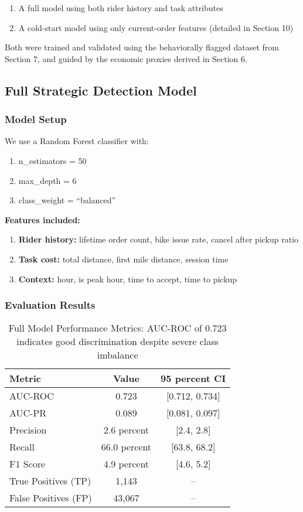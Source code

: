 \documentclass[12pt,letterpaper]{article}
\begin{document}
\begin{enumerate}
    \item A full model using both rider history and task attributes
    \item A cold-start model using only current-order features (detailed in Section 10)
\end{enumerate}

Both were trained and validated using the behaviorally flagged dataset from Section 7, and guided by the economic proxies derived in Section 6.

\subsection{Full Strategic Detection Model}

\subsubsection{Model Setup}

We use a Random Forest classifier with:

\begin{enumerate}
    \item n\_estimators = 50
    \item max\_depth = 6
    \item class\_weight = ``balanced''
\end{enumerate}

\textbf{Features included:}
\begin{enumerate}
    \item \textbf{Rider history:} lifetime order count, bike issue rate, cancel after pickup ratio
    \item \textbf{Task cost:} total distance, first mile distance, session time
    \item \textbf{Context:} hour, is peak hour, time to accept, time to pickup
\end{enumerate}

\subsubsection{Evaluation Results}

\begin{table}[H]
\centering
\caption{Full Model Performance Metrics: AUC-ROC of 0.723 indicates good discrimination despite severe class imbalance}
\label{tab:full_model_performance}
\begin{tabular}{lcc}
\toprule
Metric & Value & 95 percent CI \\
\midrule
AUC-ROC & 0.723 & [0.712, 0.734] \\
AUC-PR & 0.089 & [0.081, 0.097] \\
Precision & 2.6 percent & [2.4, 2.8] \\
Recall & 66.0 percent & [63.8, 68.2] \\
F1 Score & 4.9 percent & [4.6, 5.2] \\
True Positives (TP) & 1,143 & -- \\
False Positives (FP) & 43,067 & -- \\
\bottomrule
\end{tabular}
\end{table}
\end{document}
